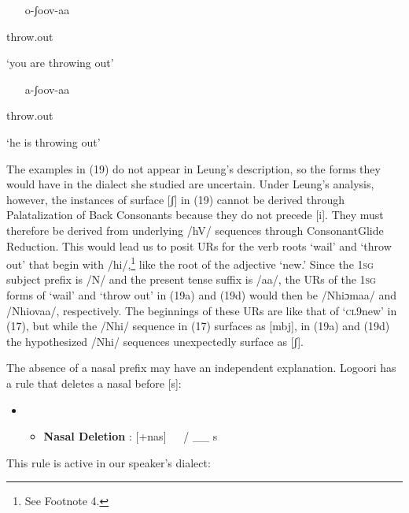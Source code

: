 \documentclass[output=paper]{langsci/langscibook}
\begin{document}
\begin{itemize}
\item [o-ʃoov-aa]  

\end{itemize}

throw.out 

‘you are throwing out’

\begin{itemize}
\item [a-ʃoov-aa]  

\end{itemize}

throw.out 

‘he is throwing out’

The examples in (19) do not appear in Leung’s description, so the forms they would have in the dialect she studied are uncertain. Under Leung’s analysis, however, the instances of surface [ʃ] in (19) cannot be derived through Palatalization of Back Consonants because they do not precede [i]. They must therefore be derived from underlying /hV/ sequences through ConsonantGlide Reduction. This would lead us to posit URs for the verb roots ‘wail’ and ‘throw out’ that begin with /hi/,\footnote{   See Footnote 4.} like the root of the adjective ‘new.’ Since the 1\textsc{sg} subject prefix is /N/ and the present tense suffix is /aa/, the URs of the 1\textsc{sg} forms of ‘wail’ and ‘throw out’ in (19a) and (19d) would then be /Nhiɔmaa/ and /Nhiovaa/, respectively. The beginnings of these URs are like that of ‘\textsc{cl}9new’ in (17), but while the /Nhi/ sequence in (17) surfaces as [mbj], in (19a) and (19d) the hypothesized /Nhi/ sequences unexpectedly surface as [ʃ]. 

The absence of a nasal prefix may have an independent explanation. Logoori has a rule that deletes a nasal before [s]:

\setcounter{itemize}{0}
\begin{itemize}
\item \setcounter{itemize}{0}
\begin{itemize}
\item \textbf{Nasal Deletion }\citep[116]{Leung1991}: [+nas]   / \_\_ s

\end{itemize}
\end{itemize}

This rule is active in our speaker’s dialect:
\end{document}
